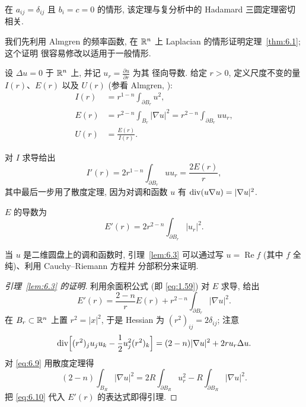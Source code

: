 在 $a_{ij}=\delta_{ij}$ 且 $b_i=c=0$ 的情形, 该定理与复分析中的
Hadamard 三圆定理密切相关.

我们先利用 Almgren 的频率函数, 在 $\mathbb{R}^n$ 上 Laplacian 的情形证明定理~\ref{thm:6.1}; 这个证明
很容易修改以适用于一般情形.

设 $\Delta u=0$ 于 $\mathbb{R}^n$ 上, 并记 $u_r=\frac{\partial u}{\partial r}$ 为其
径向导数. 给定 $r>0$, 定义尺度不变的量 $I(r)$、$E(r)$ 以及
$U(r)$ (参看 Almgren, \cite{Am2}):
\begin{align}
I(r)&=r^{1-n}\int_{\partial B_r}u^2,\label{eq:6.3}\\
E(r)&=r^{2-n}\int_{B_r}|\nabla u|^2=r^{2-n}\int_{\partial B_r}uu_r,
  \label{eq:6.4}\\
U(r)&=\frac{E(r)}{I(r)}.\label{eq:6.5}
\end{align}

对 $I$ 求导给出
\begin{equation}
I'(r)=2r^{1-n}\int_{\partial B_r}uu_r=\frac{2E(r)}{r},
\label{eq:6.6}
\end{equation}
其中最后一步用了散度定理, 因为对调和函数 $u$ 有
$\operatorname{div}(u\nabla u)=|\nabla u|^2$.

\begin{lemma}
\label{lem:6.3}
$E$ 的导数为
\begin{equation}
E'(r)=2r^{2-n}\int_{\partial B_r}|u_r|^2.
\label{eq:6.7}
\end{equation}
\end{lemma}

当 $u$ 是二维圆盘上的调和函数时, 引理~\ref{lem:6.3} 可以通过写
$u=\operatorname{Re}f$ (其中 $f$ 全纯)、利用 Cauchy--Riemann 方程并
分部积分来证明.

\begin{proof}[引理~\ref{lem:6.3} 的证明]
利用余面积公式 (即 \eqref{eq:1.59}) 对 $E$ 求导, 给出
\begin{equation}
E'(r)=\frac{2-n}{r}E(r)+r^{2-n}\int_{\partial B_r}|\nabla u|^2.
\label{eq:6.8}
\end{equation}
在 $B_r\subset\mathbb{R}^n$ 上置 $r^2=|x|^2$, 于是 Hessian 为
$(r^2)_{ij}=2\delta_{ij}$; 注意
\begin{equation}
\operatorname{div}\Bigl[(r^2)_ju_ju_k-\frac12u_j^2(r^2)_k\Bigr]
=(2-n)|\nabla u|^2+2ru_r\Delta u.
\label{eq:6.9}
\end{equation}
对 \eqref{eq:6.9} 用散度定理得
\begin{equation}
(2-n)\int_{B_R}|\nabla u|^2=2R\int_{\partial B_R}u_r^2
-R\int_{\partial B_R}|\nabla u|^2.
\label{eq:6.10}
\end{equation}
把 \eqref{eq:6.10} 代入 $E'(r)$ 的表达式即得引理.
\end{proof}

